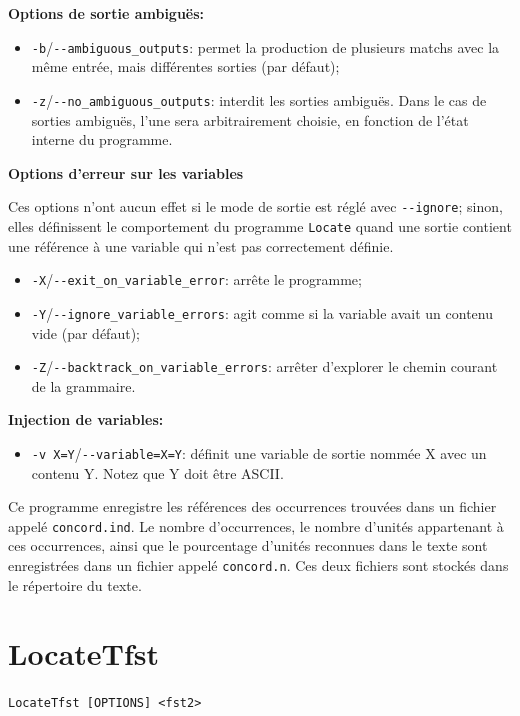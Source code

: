 \bigskip
\noindent \textbf{Options de sortie ambiguës:}
\begin{itemize}
  \item \verb+-b+/\verb+--ambiguous_outputs+: permet la production de plusieurs
   matchs avec la même entrée, mais différentes sorties (par défaut);
\item \verb+-z+/\verb+--no_ambiguous_outputs+: interdit les sorties ambiguës. Dans
	le cas de sorties ambiguës, l'une sera arbitrairement choisie, en fonction de l'état interne
	du programme.
\end{itemize}

\bigskip
\noindent \textbf{Options d'erreur sur les variables}

\noindent Ces options n'ont aucun effet si le mode de sortie est réglé avec 
\verb+--ignore+; sinon, elles définissent le comportement du programme  \verb+Locate+
quand une sortie contient une référence à une variable qui n'est pas correctement définie.
\begin{itemize}
\item \verb+-X+/\verb+--exit_on_variable_error+: arrête le programme;
\item \verb+-Y+/\verb+--ignore_variable_errors+: agit comme si la variable avait
   un contenu vide (par défaut);
\item \verb+-Z+/\verb+--backtrack_on_variable_errors+: arrêter d'explorer le chemin courant de la
	grammaire.
\end{itemize}
  
\bigskip
\noindent \textbf{Injection de variables:}
\begin{itemize}
\item \verb+-v X=Y+/\verb+--variable=X=Y+: définit une variable de sortie nommée X avec un
		contenu Y.  
  Notez que Y doit être ASCII.
\end{itemize}

\bigskip
\noindent {} Ce
programme enregistre les références des occurrences trouvées dans un fichier appelé
\verb+concord.ind+. Le nombre d'occurrences, le nombre d'unités appartenant à ces
occurrences, ainsi que le pourcentage d'unités reconnues dans le texte sont
enregistrées dans un fichier appelé
\verb+concord.n+. Ces deux fichiers sont stockés dans le répertoire du texte.







\section{LocateTfst}
\label{section-LocateTfst}
\verb+LocateTfst [OPTIONS] <fst2>+

